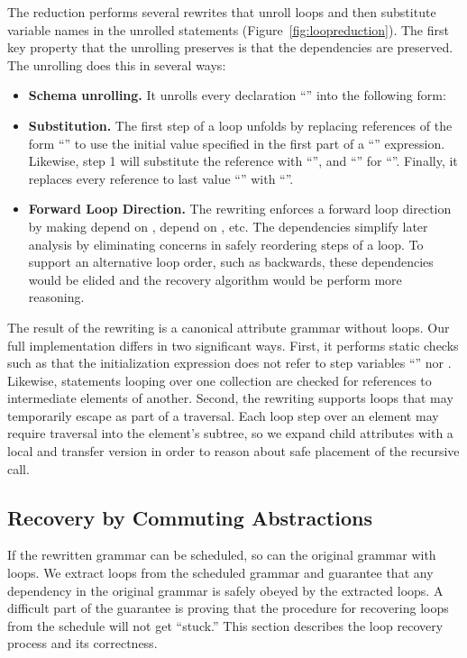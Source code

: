 The reduction performs several rewrites that unroll loops and then substitute variable names in the unrolled statements (Figure~\ref{fig:loopreduction}). The first key property that the unrolling preserves is that the dependencies are preserved. The unrolling does this in several ways:
\begin{itemize}
\item \textbf{Schema unrolling.} It unrolls every declaration ``'' into the following form:
 
\item \textbf{Substitution.} The first step of a loop unfolds by replacing references of the form ``'' to use the initial value specified in the first part of a ``'' expression. Likewise, step 1 will substitute the reference with ``'', and ``'' for ``''. Finally, it replaces every reference to last value ``'' with ``''.

\item \textbf{Forward Loop Direction.} The rewriting enforces a forward loop direction by making  depend on ,  depend on , etc. The dependencies simplify later analysis by eliminating concerns in safely reordering steps of a loop. To support an alternative loop order, such as backwards, these dependencies would be elided and the recovery algorithm would be perform more reasoning.
\end{itemize}

The result of the rewriting is a canonical attribute grammar without loops. Our full implementation differs in two significant ways. First, it performs static checks such as that the  initialization expression does not refer to step variables ``'' nor . Likewise, statements looping over one collection are checked for references to intermediate elements of another. Second, the rewriting supports loops that may temporarily escape as part of a  traversal. Each loop step over an element may require traversal into the element's subtree, so we expand child attributes with a local and transfer version in order to reason about safe placement of the recursive call. 


\subsection{Recovery by Commuting Abstractions}
If the rewritten grammar can be scheduled, so can the original grammar with loops. We extract loops from the scheduled grammar and guarantee that any dependency in the original grammar is safely obeyed by the extracted loops. A difficult part of the guarantee is proving that the procedure for recovering loops from the schedule will not get ``stuck.'' This section describes the loop recovery process and its correctness.

